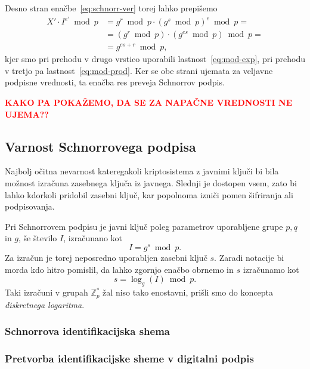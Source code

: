 \documentclass[isrm2, tisk]{fmfdelo}
\newcommand{\Z}{\mathbb Z}
\newcommand{\todo}[1]{\textcolor{red}{\textbf{\uppercase{#1}??}}}
\begin{document}
Desno stran enačbe~\eqref{eq:schnorr-ver} torej lahko prepišemo
\begin{align*}
X' \cdot I^{e'} \bmod p &= g^r \bmod p \cdot (g^s \bmod p)^e \bmod p = \\
                        &= (g^r \bmod p) \cdot (g^{es} \bmod p) \bmod p = \\ 
                        &= g^{es + r} \bmod p,
\end{align*}
kjer smo pri prehodu v drugo vrstico uporabili lastnost~\eqref{eq:mod-exp}, pri prehodu v tretjo 
pa lastnost~\eqref{eq:mod-prod}. Ker se obe strani ujemata za veljavne podpisne vrednosti, ta enačba 
res preveja Schnorrov podpis.

\todo{kako pa pokažemo, da se za napačne vrednosti ne ujema}

\subsection{Varnost Schnorrovega podpisa}
Najbolj očitna nevarnost kateregakoli kriptosistema z javnimi ključi bi bila možnost izračuna zasebnega 
ključa iz javnega. Slednji je dostopen vsem, zato bi lahko kdorkoli pridobil zasebni ključ, kar 
popolnoma izniči pomen šifriranja ali podpisovanja. 

Pri Schnorrovem podpisu je javni ključ poleg parametrov uporabljene grupe $p, q$ in $g$, še število 
$I$, izračunano kot 
$$ 
I = g^s \bmod p.
$$
Za izračun je torej neposredno uporabljen zasebni ključ $s$. Zaradi notacije bi morda kdo hitro pomislil, 
da lahko zgornjo enačbo obrnemo in $s$ izračunamo kot 
$$ 
s = \log_g(I) \bmod p.
$$
Taki izračuni v grupah $\Z_p^*$ žal niso tako enostavni, prišli smo do koncepta \textit{diskretnega 
logaritma}.

\subsubsection{Schnorrova identifikacijska shema}
\subsubsection{Pretvorba identifikacijske sheme v digitalni podpis}
\end{document}
